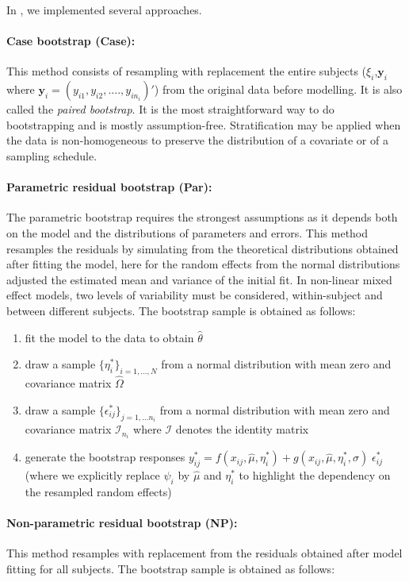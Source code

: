 In \saemix, we implemented several approaches.

\paragraph{Case bootstrap (Case):} This method consists of resampling with replacement the entire subjects ($\xi_i$,$\textbf{y}_i$ where $\textbf{y}_i= (y_{i1},y_{i2},....,y_{in_i})'$) from the original data before modelling. It is also called the \emph{paired bootstrap}. It is the most straightforward way to do bootstrapping and is mostly assumption-free. Stratification may be applied when the data is non-homogeneous to preserve the distribution of a covariate or of a sampling schedule.

\paragraph{Parametric residual bootstrap (Par):} The parametric bootstrap requires the strongest assumptions as it depends both on the model and the distributions of parameters and errors. This method resamples the residuals by simulating from the theoretical distributions obtained after fitting the model, here for the random effects from the normal distributions adjusted the estimated mean and variance of the initial fit. In non-linear mixed effect models, two levels of variability must be considered, within-subject and between different subjects. The bootstrap sample is obtained as follows:

\begin{enumerate} 
  \item fit the model to the data to obtain $\hat{\theta}$
  \item draw a sample $\{\eta^{*}_i\}_{i=1, \dots, N}$ from a normal distribution with mean zero and covariance matrix $\hat{\Omega}$
  \item draw a sample $\{\epsilon^{*}_{ij}\}_{j=1, \dots n_i}$ from a normal distribution with mean zero and covariance matrix $\mathcal{I}_{n_i}$ where $\mathcal{I}$ denotes the identity matrix
  \item generate the bootstrap responses $y^{*}_{ij}=  f(x_{ij}, \hat{\mu}, \eta^*_i) + g(x_{ij}, \hat{\mu}, \eta^*_i, \sigma) \; \epsilon^*_{ij}$ (where we explicitly replace $\psi_i$ by $\hat{\mu}$ and $\eta^*_i$ to highlight the dependency on the resampled random effects)
\end{enumerate}


\paragraph{Non-parametric residual bootstrap (NP):} This method resamples with replacement from the residuals obtained after model fitting for all subjects. The bootstrap sample is obtained as follows:

